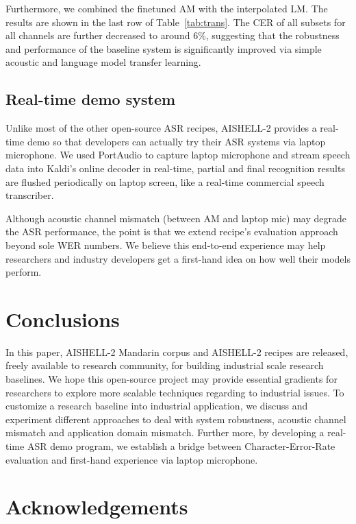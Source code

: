 \documentclass[a4paper]{article}
\begin{document}
Furthermore, we combined the finetuned AM with the interpolated LM. The results
are shown in the last row of Table~\ref{tab:trans}. The CER of all subsets for
all channels are further decreased to around 6\%, suggesting that the robustness
and performance of the baseline system is significantly improved via simple
acoustic and language model transfer learning.


\subsection{Real-time demo system}

Unlike most of the other open-source ASR recipes, AISHELL-2 provides a real-time
demo so that developers can actually try their ASR systems via laptop
microphone. We used PortAudio to capture laptop microphone and stream speech
data into Kaldi's online decoder in real-time, partial and final recognition
results are flushed periodically on laptop screen, like a real-time commercial
speech transcriber.

Although acoustic channel mismatch (between AM and laptop mic) may degrade the
ASR performance, the point is that we extend recipe's evaluation approach beyond
sole WER numbers. We believe this end-to-end experience may help researchers and
industry developers get a first-hand idea on how well their models perform.

\section{Conclusions}

In this paper, AISHELL-2 Mandarin corpus and AISHELL-2 recipes are released,
freely available to research community, for building industrial scale research
baselines. We hope this open-source project may provide essential gradients for
researchers to explore more scalable techniques regarding to industrial
issues. To customize a research baseline into industrial application, we discuss
and experiment different approaches to deal with system robustness, acoustic
channel mismatch and application domain mismatch. Further more, by developing
a real-time ASR demo program, we establish a bridge between Character-Error-Rate
evaluation and first-hand experience via laptop microphone.

\section{Acknowledgements}
\end{document}
